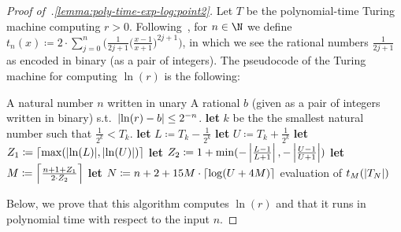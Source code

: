 \begin{proof}[Proof of~.\ref{lemma:poly-time-exp-log:point2}]
  Let $T$ be the polynomial-time Turing machine computing $r > 0$.
  Following~, for $n \in \N$ we define $t_n(x) \coloneqq
  2 \cdot \sum_{j=0}^n \big(\frac{1}{2j+1} \big(\frac{x-1}{x+1}\big)^{2j+1}\big)$, 
  in which we see the rational numbers $\frac{1}{2j+1}$ as encoded in binary (as a pair of integers).
  The pseudocode of the Turing machine for computing $\ln(r)$ is the following:
  \begin{algorithmic}[1]
    \Require \tab A natural number $n$ written in unary
    \Ensure \tab A rational $b$ (given as a pair of integers written in binary) s.t.~$\left|\ln(r)-b\right| \leq 2^{-n}$.%
    \State \textbf{let} $k$ be the the smallest natural number 
    such that $\frac{1}{2^k} < T_k$.
    \label{approxln:line1}
    \Statex {}
    \State \textbf{let} $L \coloneqq T_k-\frac{1}{2^k}$
    \label{approxln:line2}
    \State \textbf{let} $U \coloneqq T_k+\frac{1}{2^k}$ 
    \label{approxln:line3}
    \State \textbf{let} $Z_1 \coloneqq \left\lceil\max({\left|\ln(L)\right|},{\left|\ln(U)\right|})\right\rceil$ 
    \label{approxln:line4}
    \State \textbf{let} $Z_2 \coloneqq 1+\min(-\left|\frac{L-1}{L+1}\right|,-\left|\frac{U-1}{U+1}\right|)$ 
    \label{approxln:line5}
    \State \textbf{let} $M \coloneqq \left\lceil\frac{n+1+Z_1}{2 \cdot Z_2}\right\rceil$
    \label{approxln:line6}
    \State \textbf{let} $N \coloneqq n + 2 + 15M \cdot \left\lceil\log(U + 4M)\right\rceil$
    \label{approxln:line7}
    \State \myreturn evaluation of $t_M(\left|T_{N}\right|)$
    \label{approxln:line8}
  \end{algorithmic}
  Below, we prove that this algorithm computes $\ln(r)$ and that it runs in
  polynomial time with respect to the input $n$.


\end{proof}
